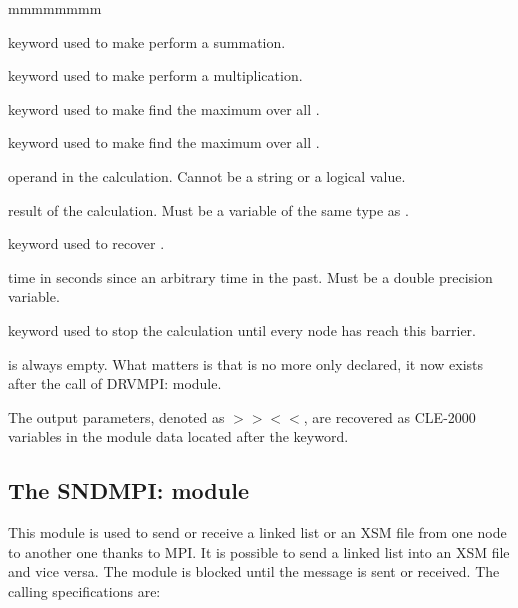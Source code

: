 \begin{ListeDeDescription}{mmmmmmmm}
\item[\moc{SUM}] keyword used to make  perform a summation.

\item[\moc{PROD}] keyword used to make  perform a multiplication.

\item[\moc{MAX}] keyword used to make  find the maximum over all .

\item[\moc{MIN}] keyword used to make  find the maximum over all .

\item[\dusa{operand}] operand in the  calculation. Cannot be a string or a logical value.

\item[\dusa{result}] result of the  calculation. Must be a variable of the same type as .

\item[\moc{TIME}] keyword used to recover .

\item[\dusa{dTime}] time in seconds since an arbitrary time in the past. Must be a double precision variable.

\item[\moc{BARRIER}] keyword used to stop the calculation until every node has reach this barrier.

\end{ListeDeDescription}

 is always empty. What matters is that  is no more only declared, it now exists after the call of DRVMPI: module.

The output parameters, denoted as $>>$$<<$, are recovered as CLE-2000 variables in the
module data located after the \moc{::} keyword.

\subsection{The SNDMPI: module}\label{sect:SNDMPIData}

This module is used to send or receive a linked list or an XSM file from one node to another one thanks to MPI. It is possible to send a linked list into an XSM file and vice versa.
The module is blocked until the message is sent or received.
The calling specifications are:

